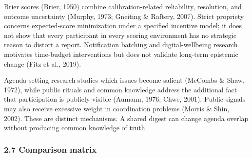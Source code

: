 \documentclass[
  11pt]{article}
\begin{document}
Brier scores (Brier, 1950) combine calibration-related reliability,
resolution, and outcome uncertainty (Murphy, 1973; Gneiting \& Raftery,
2007). Strict propriety concerns expected-score minimization under a
specified incentive model; it does not show that every participant in
every scoring environment has no strategic reason to distort a report.
Notification batching and digital-wellbeing research motivates
time-budget interventions but does not validate long-term epistemic
change (Fitz et al., 2019).

Agenda-setting research studies which issues become salient (McCombs \&
Shaw, 1972), while public rituals and common knowledge address the
additional fact that participation is publicly visible (Aumann, 1976;
Chwe, 2001). Public signals may also receive excessive weight in
coordination problems (Morris \& Shin, 2002). These are distinct
mechanisms. A shared digest can change agenda overlap without producing
common knowledge of truth.

\subsubsection{2.7 Comparison matrix}\label{comparison-matrix}
\end{document}

